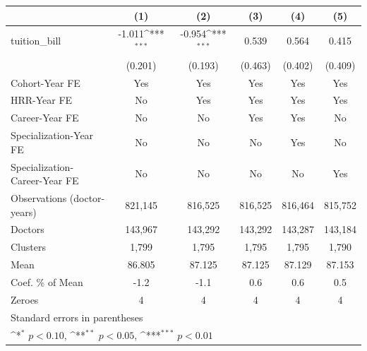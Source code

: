 {
\def\sym#1{\ifmmode^{#1}\else\(^{#1}\)\fi}
\begin{tabular}{l*{5}{c}}
\hline\hline
                    &\multicolumn{1}{c}{(1)}         &\multicolumn{1}{c}{(2)}         &\multicolumn{1}{c}{(3)}         &\multicolumn{1}{c}{(4)}         &\multicolumn{1}{c}{(5)}         \\
\hline
tuition\_bill        &      -1.011\sym{***}&      -0.954\sym{***}&       0.539         &       0.564         &       0.415         \\
                    &     (0.201)         &     (0.193)         &     (0.463)         &     (0.402)         &     (0.409)         \\
[1em]
Cohort-Year FE      &         Yes         &         Yes         &         Yes         &         Yes         &         Yes         \\
[1em]
HRR-Year FE         &          No         &         Yes         &         Yes         &         Yes         &         Yes         \\
[1em]
Career-Year FE      &          No         &          No         &         Yes         &         Yes         &          No         \\
[1em]
Specialization-Year FE&          No         &          No         &          No         &         Yes         &          No         \\
[1em]
Specialization-Career-Year FE&          No         &          No         &          No         &          No         &         Yes         \\
\hline
Observations (doctor-years)&     821,145         &     816,525         &     816,525         &     816,464         &     815,752         \\
Doctors             &     143,967         &     143,292         &     143,292         &     143,287         &     143,184         \\
Clusters            &       1,799         &       1,795         &       1,795         &       1,795         &       1,790         \\
Mean                &      86.805         &      87.125         &      87.125         &      87.129         &      87.153         \\
Coef. \% of Mean    &        -1.2         &        -1.1         &         0.6         &         0.6         &         0.5         \\
Zeroes              &           4         &           4         &           4         &           4         &           4         \\
\hline\hline
\multicolumn{6}{l}{\footnotesize Standard errors in parentheses}\\
\multicolumn{6}{l}{\footnotesize \sym{*} \(p<0.10\), \sym{**} \(p<0.05\), \sym{***} \(p<0.01\)}\\
\end{tabular}
}
